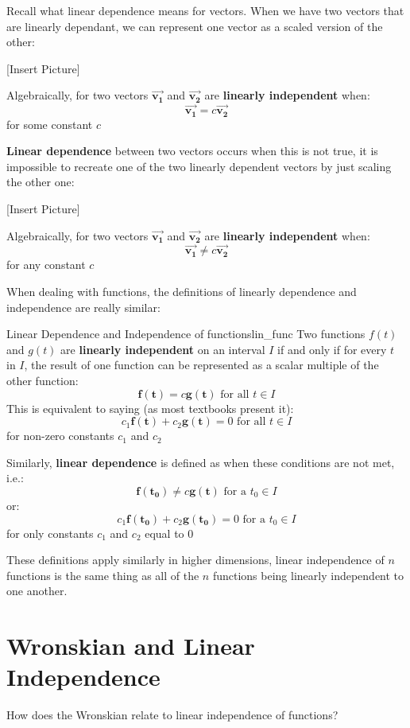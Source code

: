 \documentclass{report}
\begin{document}
Recall what linear dependence means for vectors. When we have two vectors that are linearly dependant, we can represent one vector as a scaled version of the other:

[Insert Picture]

Algebraically, for two vectors $\bm{\vec{v_1}}$ and $\bm{\vec{v_2}}$ are \textbf{linearly independent} when:
$$\bm{\vec{v_1}} = c\bm{\vec{v_2}}$$
for some constant $c$

\textbf{Linear dependence} between two vectors occurs when this is not true, it is impossible to recreate one of the two linearly dependent vectors by just scaling the other one:

[Insert Picture]

Algebraically, for two vectors $\bm{\vec{v_1}}$ and $\bm{\vec{v_2}}$ are \textbf{linearly independent} when:
$$\bm{\vec{v_1}} \neq c\bm{\vec{v_2}}$$
for any constant $c$

When dealing with functions, the definitions of linearly dependence and independence are really similar:

\begin{mytheo}{Linear Dependence and Independence of functions}{lin_func}
    Two functions $f(t)$ and $g(t)$ are \textbf{linearly independent} on an interval $I$ if and only if for every $t$ in $I$, the result of one function can be represented as a scalar multiple of the other function:
    $$\bm{f(t)} = c\bm{g(t)} \text{ for all $t \in I$}$$
    This is equivalent to saying (as most textbooks present it):
    $$c_1\bm{f(t)} + c_2\bm{g(t)} = 0 \text{ for all $t \in I$}$$
    for non-zero constants $c_1$ and $c_2$
    
    Similarly, \textbf{linear dependence} is defined as when these conditions are not met, i.e.:
    $$\bm{f(t_0)} \neq c\bm{g(t)} \text{ for a $t_0 \in I$}$$
    or:
    $$c_1\bm{f(t_0)} + c_2\bm{g(t_0)} = 0 \text{ for a $t_0 \in I$}$$
    for only constants $c_1$ and $c_2$ equal to 0
    
\end{mytheo}

These definitions apply similarly in higher dimensions, linear independence of $n$ functions is the same thing as all of the $n$ functions being linearly independent to one another.

\section{Wronskian and Linear Independence}
How does the Wronskian relate to linear independence of functions?
\end{document}
